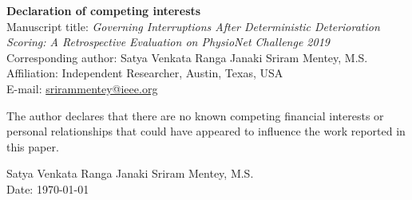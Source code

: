 \documentclass[11pt]{article}
\begin{document}
\noindent\textbf{Declaration of competing interests}\\[0.8em]
Manuscript title: \textit{Governing Interruptions After Deterministic
Deterioration Scoring: A Retrospective Evaluation on PhysioNet Challenge
2019}\\[0.6em]
Corresponding author: Satya Venkata Ranga Janaki Sriram Mentey, M.S.\\
Affiliation: Independent Researcher, Austin, Texas, USA\\
E-mail: \href{mailto:srirammentey@ieee.org}{srirammentey@ieee.org}

\vspace{1em}
The author declares that there are no known competing financial interests or
personal relationships that could have appeared to influence the work reported
in this paper.

\vspace{1.5em}
\noindent Satya Venkata Ranga Janaki Sriram Mentey, M.S.\\
Date: \today
\end{document}
